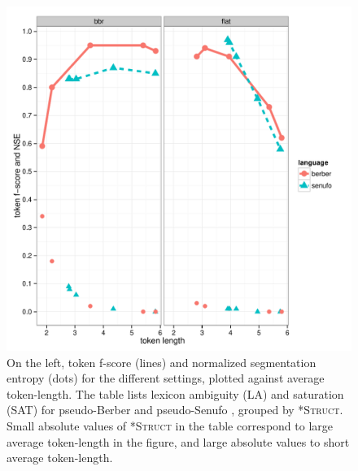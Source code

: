 \documentclass[11pt]{article}
\begin{document}
\begin{figure}[t!]
\begin{minipage}[t]{0.50\paperwidth}%
\vspace{-50pt}
	\includegraphics[scale=0.55]{plots/bens_version_2.pdf}
\end{minipage}%
\begin{minipage}[t][1\totalheight][c]{0.3\paperwidth}%
\vspace{0pt}
\end{minipage}
\caption{\label{Results.} On the left, token f-score (lines) and normalized segmentation entropy (dots) for the different settings, plotted against average token-length. The table lists lexicon ambiguity (LA) and saturation (SAT) for pseudo-Berber and pseudo-Senufo , grouped by \textsc{*Struct}. Small absolute values of \textsc{*Struct} in the table correspond to large average token-length in the figure, and large absolute values to short average token-length.}
\end{figure}
\end{document}
